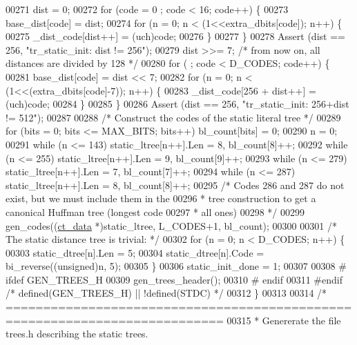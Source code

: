 \begin{DoxyCode}
{{00271     dist = 0;
00272     \textcolor{keywordflow}{for} (code = 0 ; code < 16; code++) \{
00273         base\_dist[code] = dist;
00274         \textcolor{keywordflow}{for} (n = 0; n < (1<<extra\_dbits[code]); n++) \{
00275             \_dist\_code[dist++] = (uch)code;
00276         \}
00277     \}
00278     Assert (dist == 256, \textcolor{stringliteral}{"tr\_static\_init: dist != 256"});
00279     dist >>= 7; \textcolor{comment}{/* from now on, all distances are divided by 128 */}
00280     \textcolor{keywordflow}{for} ( ; code < D\_CODES; code++) \{
00281         base\_dist[code] = dist << 7;
00282         \textcolor{keywordflow}{for} (n = 0; n < (1<<(extra\_dbits[code]-7)); n++) \{
00283             \_dist\_code[256 + dist++] = (uch)code;
00284         \}
00285     \}
00286     Assert (dist == 256, \textcolor{stringliteral}{"tr\_static\_init: 256+dist != 512"});
00287 
00288     \textcolor{comment}{/* Construct the codes of the static literal tree */}
00289     \textcolor{keywordflow}{for} (bits = 0; bits <= MAX\_BITS; bits++) bl\_count[bits] = 0;
00290     n = 0;
00291     \textcolor{keywordflow}{while} (n <= 143) static\_ltree[n++].Len = 8, bl\_count[8]++;
00292     \textcolor{keywordflow}{while} (n <= 255) static\_ltree[n++].Len = 9, bl\_count[9]++;
00293     \textcolor{keywordflow}{while} (n <= 279) static\_ltree[n++].Len = 7, bl\_count[7]++;
00294     \textcolor{keywordflow}{while} (n <= 287) static\_ltree[n++].Len = 8, bl\_count[8]++;
00295     \textcolor{comment}{/* Codes 286 and 287 do not exist, but we must include them in the}
00296 \textcolor{comment}{     * tree construction to get a canonical Huffman tree (longest code}
00297 \textcolor{comment}{     * all ones)}
00298 \textcolor{comment}{     */}
00299     gen\_codes((\hyperlink{structct__data__s}{ct\_data} *)static\_ltree, L\_CODES+1, bl\_count);
00300 
00301     \textcolor{comment}{/* The static distance tree is trivial: */}
00302     \textcolor{keywordflow}{for} (n = 0; n < D\_CODES; n++) \{
00303         static\_dtree[n].Len = 5;
00304         static\_dtree[n].Code = bi\_reverse((\textcolor{keywordtype}{unsigned})n, 5);
00305     \}
00306     static\_init\_done = 1;
00307 
00308 \textcolor{preprocessor}{#  ifdef GEN\_TREES\_H}
00309     gen\_trees\_header();
00310 \textcolor{preprocessor}{#  endif}
00311 \textcolor{preprocessor}{#endif }\textcolor{comment}{/* defined(GEN\_TREES\_H) || !defined(STDC) */}\textcolor{preprocessor}{}
00312 \}
00313 
00314 \textcolor{comment}{/* ===========================================================================}
00315 \textcolor{comment}{ * Genererate the file trees.h describing the static trees.}
}}
\end{DoxyCode}
